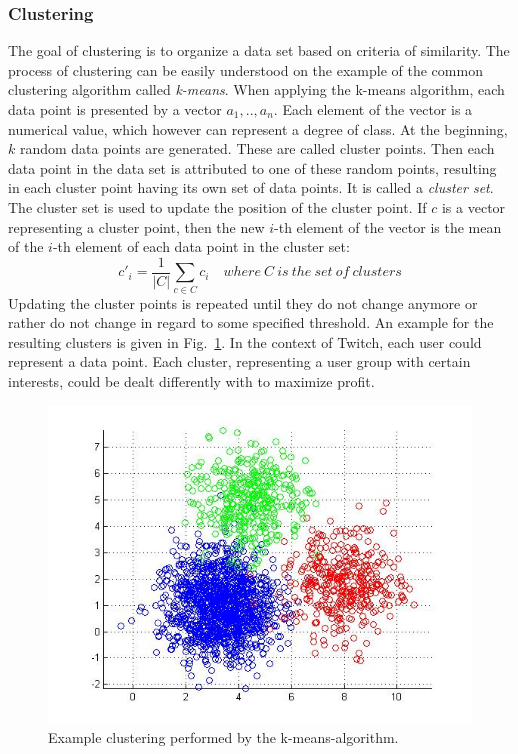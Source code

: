 \subsubsection{Clustering} 
The goal of clustering is to organize a data set based on criteria of similarity.
The process of clustering can be easily understood on the example of the common clustering 
algorithm called \textit{k-means}. When applying the k-means algorithm, each data point                
is presented by a vector \( a_{1}, .., a_{n} \). Each element of the vector
is a numerical value, which however can represent a degree of class. At the beginning,
$k$ random data points are generated. These are called cluster points. Then each data point in the data set is attributed
to one of these random points, resulting in each cluster point having its own set of data points. It is called a \textit{cluster set}.
The cluster set is used to update the position of the cluster point. If $c$ is a 
vector representing a cluster point, then the new $i$-th element of the vector is the 
mean of the $i$-th element of each data point in the cluster set:
\[ c'_{i} =  \frac{1}{ |C| } \sum_{ c \in C} c_{i} \quad where~C~is~the~set~of~clusters \]
Updating the cluster points is repeated until they do not change anymore or rather
do not change in regard to some specified threshold. An example for the resulting clusters is given in Fig.~\ref{fig:k-means}. 
In the context of Twitch, each user could represent a data point. 
Each cluster, representing a user group with certain interests, could be dealt differently with to maximize profit. 

\begin{figure}[h!]
	\centering
	\includegraphics[width=0.8\linewidth]{sections/figures/k-means-clustering}
	\caption{Example clustering performed by the k-means-algorithm. }
	\label{fig:k-means}
\end{figure}

